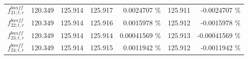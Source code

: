 \begin{table}
\begin{tabular}{| l | r | r | r  r | r  r |}
                                                          $f_{21; t, r}^{banff}$ &         120.349 & 125.914 & 125.917 &       0.0024707 \%  &         125.911 &      -0.0024707 \%  \\ 
                                                          $f_{22; t, r}^{banff}$ &         120.349 & 125.914 & 125.916 &       0.0015978 \%  &         125.912 &      -0.0015978 \%  \\ 
                                                          $f_{23; t, r}^{banff}$ &         120.349 & 125.914 & 125.914 &      0.00041569 \%  &         125.913 &     -0.00041569 \%  \\ 
                                                          $f_{24; t, r}^{banff}$ &         120.349 & 125.914 & 125.915 &       0.0011942 \%  &         125.912 &      -0.0011942 \%  \\ 

\end{tabular}
\end{table}
